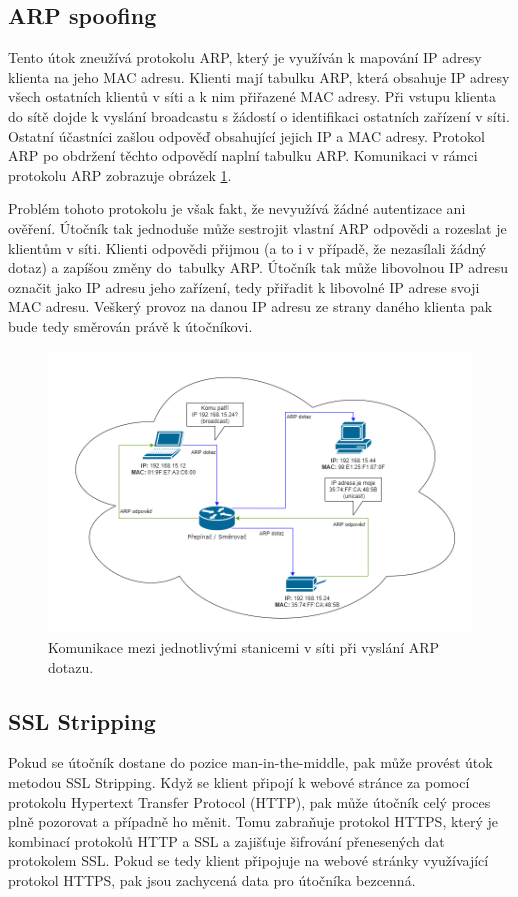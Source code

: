 \subsection{ARP spoofing}
Tento útok zneužívá protokolu ARP, který je využíván k mapování IP adresy klienta na jeho MAC adresu. Klienti mají tabulku ARP, která obsahuje IP adresy všech ostatních klientů v síti a k nim přiřazené MAC adresy. Při vstupu klienta do sítě dojde k vyslání broadcastu s žádostí o identifikaci ostatních zařízení v síti. Ostatní účastníci zašlou odpověď obsahující jejich IP a MAC adresy. Protokol ARP po obdržení těchto odpovědí naplní tabulku ARP. Komunikaci v rámci protokolu ARP zobrazuje obrázek \ref{img:arp}.

Problém tohoto protokolu je však fakt, že nevyužívá žádné autentizace ani ověření. Útočník tak jednoduše může sestrojit vlastní ARP odpovědi a rozeslat je klientům v síti. Klienti odpovědi přijmou (a to i v případě, že nezasílali žádný dotaz) a zapíšou změny do~tabulky ARP. Útočník tak může libovolnou IP adresu označit jako IP adresu jeho zařízení, tedy přiřadit k libovolné IP adrese svoji MAC adresu. Veškerý provoz na danou IP adresu ze strany daného klienta pak bude tedy směrován právě k útočníkovi.
\begin{figure}[htbp]
  \centering
  \includegraphics[width=14.7cm]{obrazky-figures/arp.png}
  \caption{Komunikace mezi jednotlivými stanicemi v síti při vyslání ARP dotazu.}
  \label{img:arp}
\end{figure}

\subsection{SSL Stripping}
Pokud se útočník dostane do pozice man-in-the-middle, pak může provést útok metodou SSL Stripping. Když se klient připojí k webové stránce za pomocí protokolu Hypertext Transfer Protocol (HTTP), pak může útočník celý proces plně pozorovat a případně ho měnit. Tomu zabraňuje protokol HTTPS, který je kombinací protokolů HTTP a SSL a zajišťuje šifrování přenesených dat protokolem SSL. Pokud se tedy klient připojuje na webové stránky využívající protokol HTTPS, pak jsou zachycená data pro útočníka bezcenná. 

